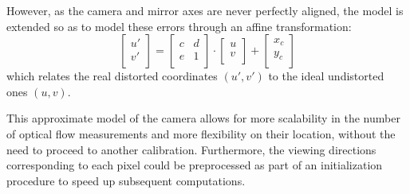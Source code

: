 However, as the camera and mirror axes are never perfectly aligned, the model is extended so as to model these errors through an affine transformation:
\begin{equation}
\label{equ:cameraModel2}
\begin{bmatrix}
u'\\
v'\\
\end{bmatrix}
=
\begin{bmatrix}
c & d\\
e & 1\\
\end{bmatrix}
\cdot
\begin{bmatrix}
u\\
v\\
\end{bmatrix}
+
\begin{bmatrix}
x_c\\
y_c\\
\end{bmatrix}
\end{equation}
which relates the real distorted coordinates $(u', v')$ to the ideal undistorted ones $(u,v)$.

This approximate model of the camera allows for more scalability in the number of optical flow measurements and more flexibility on their location, without the need to proceed to another calibration. Furthermore, the viewing directions corresponding to each pixel could be preprocessed as part of an initialization procedure to speed up subsequent computations.

